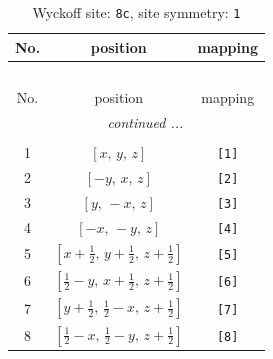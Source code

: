 \documentclass[fleqn,8pt]{jsarticle}
\begin{document}
\renewcommand{\arraystretch}{1.2}
\begin{longtable}{ccc}
\caption{Wyckoff site: {\tt 8c}, site symmetry: {\tt 1}}
 \\
 \hline \hline
No. & position & mapping \\ \hline \endfirsthead

\multicolumn{2}{l}{\tablename\ \thetable{}} \\
 \hline \hline
No. & position & mapping \\ \hline \endhead

 \hline \hline
\multicolumn{2}{r}{\footnotesize\it continued ...} \\ \endfoot

 \hline \hline
\multicolumn{2}{r}{} \\ \endlastfoot

1 & $\left[ x,\, y,\, z \right]$ & {\tt [1]} \\ \hline
2 & $\left[ - y,\, x,\, z \right]$ & {\tt [2]} \\ \hline
3 & $\left[ y,\, - x,\, z \right]$ & {\tt [3]} \\ \hline
4 & $\left[ - x,\, - y,\, z \right]$ & {\tt [4]} \\ \hline
5 & $\left[ x + \frac{1}{2},\, y + \frac{1}{2},\, z + \frac{1}{2} \right]$ & {\tt [5]} \\ \hline
6 & $\left[ \frac{1}{2} - y,\, x + \frac{1}{2},\, z + \frac{1}{2} \right]$ & {\tt [6]} \\ \hline
7 & $\left[ y + \frac{1}{2},\, \frac{1}{2} - x,\, z + \frac{1}{2} \right]$ & {\tt [7]} \\ \hline
8 & $\left[ \frac{1}{2} - x,\, \frac{1}{2} - y,\, z + \frac{1}{2} \right]$ & {\tt [8]} \\
\end{longtable}
\end{document}
